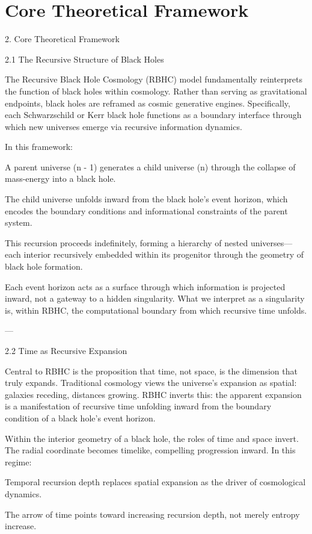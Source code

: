 \documentclass[11pt,a4paper]{article}
\begin{document}
\section{Core Theoretical Framework}
2. Core Theoretical Framework

2.1 The Recursive Structure of Black Holes

The Recursive Black Hole Cosmology (RBHC) model fundamentally reinterprets the function of black holes within cosmology. Rather than serving as gravitational endpoints, black holes are reframed as cosmic generative engines. Specifically, each Schwarzschild or Kerr black hole functions as a boundary interface through which new universes emerge via recursive information dynamics.

In this framework:

A parent universe (n - 1) generates a child universe (n) through the collapse of mass-energy into a black hole.

The child universe unfolds inward from the black hole’s event horizon, which encodes the boundary conditions and informational constraints of the parent system.

This recursion proceeds indefinitely, forming a hierarchy of nested universes—each interior recursively embedded within its progenitor through the geometry of black hole formation.


Each event horizon acts as a surface through which information is projected inward, not a gateway to a hidden singularity. What we interpret as a singularity is, within RBHC, the computational boundary from which recursive time unfolds.


---

2.2 Time as Recursive Expansion

Central to RBHC is the proposition that time, not space, is the dimension that truly expands. Traditional cosmology views the universe’s expansion as spatial: galaxies receding, distances growing. RBHC inverts this: the apparent expansion is a manifestation of recursive time unfolding inward from the boundary condition of a black hole’s event horizon.

Within the interior geometry of a black hole, the roles of time and space invert. The radial coordinate becomes timelike, compelling progression inward. In this regime:

Temporal recursion depth replaces spatial expansion as the driver of cosmological dynamics.

The arrow of time points toward increasing recursion depth, not merely entropy increase.
\end{document}
